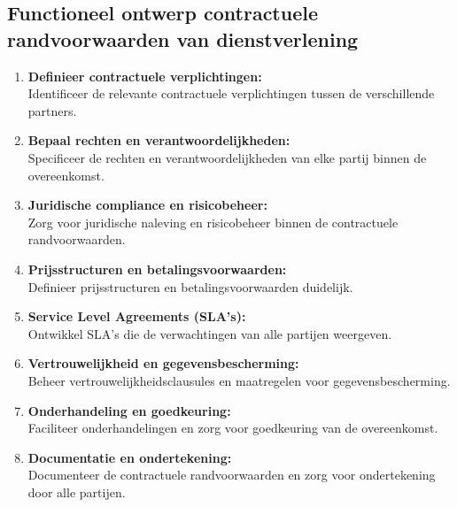 \documentclass{article} %
\begin{document}
\subsection{Functioneel ontwerp contractuele randvoorwaarden van dienstverlening}
\begin{enumerate}
    \item \textbf{Definieer contractuele verplichtingen:} \\
    \indent Identificeer de relevante contractuele verplichtingen tussen de verschillende partners.
    \item \textbf{Bepaal rechten en verantwoordelijkheden:} \\
    \indent Specificeer de rechten en verantwoordelijkheden van elke partij binnen de overeenkomst.
    \item \textbf{Juridische compliance en risicobeheer:} \\
    \indent Zorg voor juridische naleving en risicobeheer binnen de contractuele randvoorwaarden.
    \item \textbf{Prijsstructuren en betalingsvoorwaarden:} \\
    \indent Definieer prijsstructuren en betalingsvoorwaarden duidelijk.
    \item \textbf{Service Level Agreements (SLA's):} \\
    \indent Ontwikkel SLA's die de verwachtingen van alle partijen weergeven.
    \item \textbf{Vertrouwelijkheid en gegevensbescherming:} \\
    \indent Beheer vertrouwelijkheidsclausules en maatregelen voor gegevensbescherming.
    \item \textbf{Onderhandeling en goedkeuring:} \\
    \indent Faciliteer onderhandelingen en zorg voor goedkeuring van de overeenkomst.
    \item \textbf{Documentatie en ondertekening:} \\
    \indent Documenteer de contractuele randvoorwaarden en zorg voor ondertekening door alle partijen.
\end{enumerate}
\end{document}
